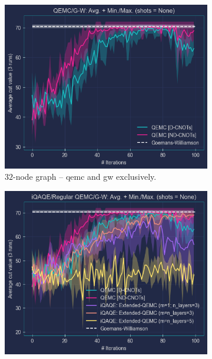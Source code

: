 \begin{figure}[hb!]
    \centering
    \begin{subfigure}[b]{0.495\textwidth}
        \centering
        \includegraphics[width=1\textwidth]{Figures/Chapter_5/Large graphs/32-node_Graph(QEMC&G-W).png}
        \caption{$32$-node graph – \acrshort{qemc} and \acrshort{gw} exclusively.}
        \label{fig:32-node_Graph(QEMC&G-W)}
    \end{subfigure}
    \hfill
    \begin{subfigure}[b]{0.495\textwidth}
        \centering
        \includegraphics[width=1\textwidth]{Figures/Chapter_5/Large graphs/32-node_Graph.png}

\end{subfigure}
\end{figure}
